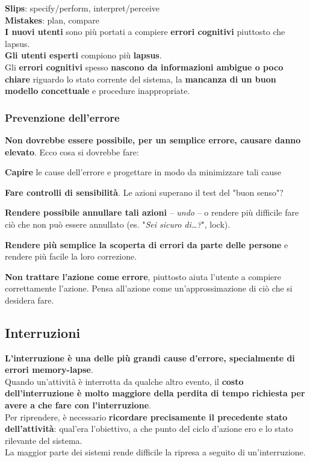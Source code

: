 \documentclass[10pt]{article}
\begin{document}
\textbf{Slips}: specify/perform, interpret/perceive\\
\textbf{Mistakes}: plan, compare\\
\textbf{I nuovi utenti} sono più portati a compiere \textbf{errori cognitivi} piuttosto che lapsus.\\
\textbf{Gli utenti esperti} compiono più \textbf{lapsus}.\\
Gli \textbf{errori cognitivi} spesso \textbf{nascono da informazioni ambigue o poco chiare} riguardo lo stato corrente del sistema, la \textbf{mancanza di un buon modello concettuale} e procedure inappropriate.
\subsubsection{Prevenzione dell'errore}
\textbf{Non dovrebbe essere possibile, per un semplice errore, causare danno elevato}. Ecco cosa si dovrebbe fare:
\begin{list}{}{}
\item \textbf{Capire} le cause dell'errore e progettare in modo da minimizzare tali cause
\item \textbf{Fare controlli di sensibilità}. Le azioni superano il test del "buon senso"?
\item \textbf{Rendere possibile annullare tali azioni} -- \textit{undo} -- o rendere più difficile fare ciò che non può essere annullato (es. "\textit{Sei sicuro di\ldots?}", lock).
\item \textbf{Rendere più semplice la scoperta di errori da parte delle persone} e rendere più facile la loro correzione.
\item \textbf{Non trattare l'azione come errore}, piuttosto aiuta l'utente a compiere correttamente l'azione. Pensa all'azione come un'approssimazione di ciò che si desidera fare.
\end{list}
\subsection{Interruzioni}
\textbf{L'interruzione è una delle più grandi cause d'errore, specialmente di errori memory-lapse}.\\
Quando un'attività è interrotta da qualche altro evento, il \textbf{costo dell'interruzione è molto maggiore della perdita di tempo richiesta per avere a che fare con l'interruzione}.\\
Per riprendere, è necessario \textbf{ricordare precisamente il precedente stato dell'attività}: qual'era l'obiettivo, a che punto del ciclo d'azione ero e lo stato rilevante del sistema.\\
La maggior parte dei sistemi rende difficile la ripresa a seguito di un'interruzione.
\end{document}
